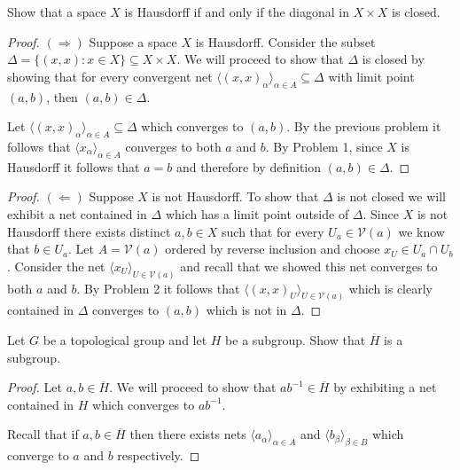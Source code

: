 \documentclass[minion]{homework651}
\begin{document}
\begin{problems}
% 
\problem Show that a space $X$ is Hausdorff if and only if the diagonal in $X\times X$ is closed.
\begin{proof}$(\Rightarrow)$ Suppose a space $X$ is Hausdorff. Consider the subset 
    $\Delta = \{(x, x): x \in X\}\subseteq X \times X$. We will proceed to show that 
    $\Delta$ is closed by showing that for every convergent net $\langle (x, x)_\alpha\rangle_{\alpha \in A} \subseteq \Delta$ 
    with limit point $(a, b)$, then $(a, b) \in \Delta$.
   
    Let $\langle (x, x)_\alpha\rangle_{\alpha \in A} \subseteq \Delta$ which converges to $(a, b)$. By the previous problem it follows that 
    $\langle x_\alpha \rangle_{\alpha \in A}$ converges to both $a$ and $b$. By Problem 1, since $X$ is Hausdorff it follows that $a = b$ and therefore by definition $(a, b) \in \Delta$.
\end{proof}

\begin{proof}$(\Leftarrow)$ Suppose $X$ is not Hausdorff. To show that $\Delta$ is not closed we will exhibit 
    a net contained in $\Delta$ which has a limit point outside of $\Delta$. Since $X$ is not Hausdorff there exists distinct $a, b \in X$ such that 
    for every $U_a \in \mathcal{V}(a)$ we know that $b \in U_a$. Let $A =\mathcal{V}(a)$ ordered by reverse inclusion and choose 
    $x_U \in U_a \cap U_b$. Consider the net $\langle x_U \rangle_{U \in \mathcal{V}(a)}$ and recall that we showed this net converges to both $a$ and $b$. 
    By Problem 2 it follows that $\langle (x, x)_U \rangle_{U \in \mathcal{V}(a)}$ which is clearly contained in $\Delta$ converges to $(a, b)$ which is not in $\Delta$.     
\end{proof}





\problem Let $G$ be a topological group and let $H$ be a subgroup. Show that 
$\overline{H}$ is a subgroup.
\begin{proof} Let $a, b \in \overline{H}$. We will proceed to show that $ab^{-1} \in \overline{H}$ by exhibiting a net 
    contained in $H$ which converges to $ab^{-1}$.
    
    
    Recall that if $a, b \in \overline{H}$ then there exists nets $\langle a_\alpha \rangle_{\alpha \in A}$
    and $\langle b_\beta \rangle_{\beta \in B}$ which converge to $a$ and $b$ respectively. 
    

\end{proof}
\end{problems}
\end{document}
